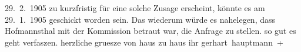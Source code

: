 \begin{ledgroupsized}[t]{13cm}
{{{                     29. 2. 1905 zu kurzfristig für eine solche Zusage erscheint,
                  könnte es am 29. 1. 1905 geschickt worden sein. Das wiederum würde es
                  nahelegen, dass Hofmannsthal mit der
                  Kommission betraut war, die Anfrage zu stellen.}}}\label{K_L01496_1h} so gut es geht verfaszen.
               herzliche gruesze von haus zu haus ihr \spacefill\mbox{gerhart hauptmann +}\pend
                     \endnumbering{}\end{ledgroupsized}  \newcommand{\dateiname}{L01496}\newcommand{\titel}{Gerhart Hauptmann an Arthur Schnitzler, 29. [1. 1905?]}\newcommand{\editorInnen}{Martin Anton Müller und Gerd-Hermann Susen}
            \footnotesize
\begin{ledgroupsized}[t]{11.5cm}
\end{ledgroupsized}
         
      